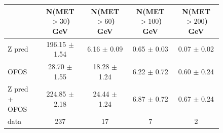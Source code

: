 \begin{figure}[hbtp]
  \begin{center}

	\medskip 

    \begin{tabular}{lcccc}
\hline
                        &   N(MET $>30$)  GeV    &   N(MET $>60$)  GeV    &   N(MET $>100$) GeV    &   N(MET $>200$) GeV \\
\hline
              Z pred    &  196.15 $\pm$  1.54    &   6.16  $\pm$  0.09    &    0.65 $\pm$  0.03    &   0.07  $\pm$  0.02 \\
                OFOS    &   28.70 $\pm$  1.55    &  18.28  $\pm$  1.24    &    6.22 $\pm$  0.72    &   0.60  $\pm$  0.24 \\
\hline
       Z pred + OFOS    &  224.85 $\pm$  2.18    &  24.44  $\pm$  1.24    &    6.87 $\pm$  0.72    &   0.67  $\pm$  0.24 \\
\hline
                   data &    237                 &    17                  &     7                  &     2 \\

\hline
    \end{tabular}

    \caption{ \resultcaption{$\mu\mu$} }
    \label{fig:pfmet_mm}
  \end{center}
\end{figure}


